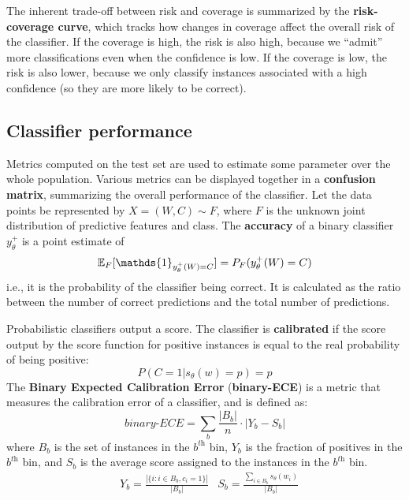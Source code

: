 The inherent trade-off between risk and coverage is summarized by the \textbf{risk-coverage curve}, which tracks how changes in coverage affect the overall risk of the classifier. If the coverage is high, the risk is also high, because we ``admit'' more classifications even when the confidence is low. If the coverage is low, the risk is also lower, because we only classify instances associated with a high confidence (so they are more likely to be correct).

\subsection{Classifier performance}

Metrics computed on the test set are used to estimate some parameter over the whole population. Various metrics can be displayed together in a \textbf{confusion matrix}, summarizing the overall performance of the classifier. Let the data points be represented by $X = (W,C) \sim F$, where $F$ is the unknown joint distribution of predictive features and class. The \textbf{accuracy} of a binary classifier $y_{\theta}^+$ is a point estimate of
\begin{equation*}
    \E_F[\mathds{1}_{y_{\theta}^+(W) = C}] = P_F(y_{\theta}^+(W) = C)
\end{equation*}
i.e., it is the probability of the classifier being correct. It is calculated as the ratio between the number of correct predictions and the total number of predictions.

Probabilistic classifiers output a score. The classifier is \textbf{calibrated} if the score output by the score function for positive instances is equal to the real probability of being positive:
\begin{equation*}
    P(C=1|s_{\theta}(w) = p) = p
\end{equation*}
The \textbf{Binary Expected Calibration Error} (\textbf{binary-ECE}) is a metric that measures the calibration error of a classifier, and is defined as:
\begin{equation*}
    \textit{binary-ECE} = \sum_b \frac{|B_b|}{n} \cdot |Y_b - S_b| 
\end{equation*}
where $B_b$ is the set of instances in the $b^{\textit{th}}$ bin, $Y_b$ is the fraction of positives in the $b^{\textit{th}}$ bin, and $S_b$ is the average score assigned to the instances in the $b^{\textit{th}}$ bin.
\begin{align*}
    &Y_b = \frac{|\{i : i \in B_b, c_i = 1\}|}{|B_b|} &S_b =  \frac{\sum_{i \in B_b} s_{\theta}(w_i)}{|B_b|}
\end{align*}

